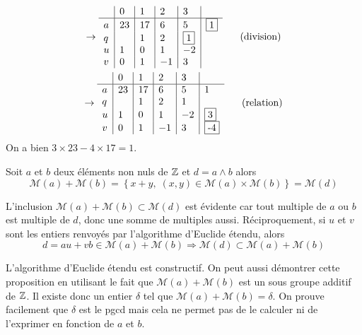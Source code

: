 \begin{multline*}
\rightarrow
\begin{array}{l|l|l|l|l|l}
  & 0  & 1  & 2  & 3       &          \\ \hline
a & 23 & 17 & 6  & 5       & \fbox{1} \\ 
q &    & 1  & 2  & \fbox{1}&          \\ 
u & 1  & 0  & 1  & -2      &          \\
v & 0  & 1  & -1 & 3       &
\end{array}\hspace{0.5cm} \text{ (division)} \\
\rightarrow
\begin{array}{l|l|l|l|l|l}
  & 0  & 1  & 2  & 3  &          \\ \hline
a & 23 & 17 & 6  & 5  & 1        \\ 
q &    & 1  & 2  & 1  &          \\ 
u & 1  & 0  & 1  & -2 & \fbox{3} \\
v & 0  & 1  & -1 & 3  & \fbox{-4}
\end{array}\hspace{0.5cm} \text{ (relation)}
\end{multline*}
On a bien $3\times 23 -4\times 17 = 1$.
\begin{propn}\label{sommult}
 Soit $a$ et $b$ deux éléments non nuls de $\mathbb{Z}$ et $d=a\wedge b$ alors
\begin{displaymath}
  \mathcal{M}(a) + \mathcal{M}(b) = \left\lbrace x+y,\; (x,y)\in \mathcal{M}(a)\times \mathcal{M}(b)\right\rbrace = \mathcal{M}(d)
\end{displaymath}
\end{propn}
\begin{demo}
L'inclusion $\mathcal{M}(a) + \mathcal{M}(b) \subset \mathcal{M}(d)$ est évidente car tout multiple de $a$ ou $b$ est multiple de $d$, donc une somme de multiples aussi. Réciproquement, si $u$ et $v$ sont les entiers renvoyés par l'algorithme d'Euclide étendu, alors 
\begin{displaymath}
d = au + vb \in \mathcal{M}(a) + \mathcal{M}(b) \Rightarrow \mathcal{M}(d) \subset \mathcal{M}(a) + \mathcal{M}(b)  
\end{displaymath}
\end{demo}
\begin{rem}
  L'algorithme d'Euclide étendu est constructif. On peut aussi démontrer cette proposition en utilisant le fait que $\mathcal{M}(a) + \mathcal{M}(b)$ est un sous groupe additif de $\mathbb{Z}$. Il existe donc un entier $\delta$ tel que $\mathcal{M}(a) + \mathcal{M}(b)=\mathcal{\delta}$. On prouve facilement que $\delta$ est le pgcd mais cela ne permet pas de le calculer ni de l'exprimer en fonction de $a$ et $b$.
\end{rem}


